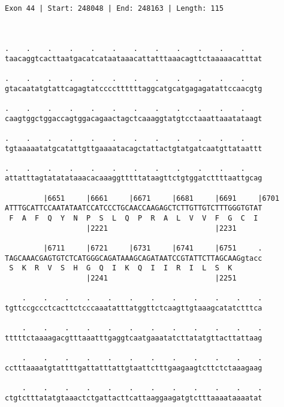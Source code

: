 \documentclass{article}
\begin{document}
\begin{Verbatim}
  
 
Exon 44 | Start: 248048 | End: 248163 | Length: 115



.    .    .    .    .    .    .    .    .    .    .    .    
taacaggtcacttaatgacatcataataaacattatttaaacagttctaaaaacatttat
                                                            
.    .    .    .    .    .    .    .    .    .    .    .    
gtacaatatgtattcagagtatccccttttttaggcatgcatgagagatattccaacgtg
                                                            
.    .    .    .    .    .    .    .    .    .    .    .    
caagtggctggaccagtggacagaactagctcaaaggtatgtcctaaattaaatataagt
                                                            
.    .    .    .    .    .    .    .    .    .    .    .    
tgtaaaaatatgcatattgttgaaaatacagctattactgtatgatcaatgttataattt
                                                            
.    .    .    .    .    .    .    .    .    .    .    .    
attatttagtatatataaacacaaaggtttttataagttctgtggatcttttaattgcag
                                                            
         |6651     |6661     |6671     |6681     |6691     |6701
ATTTGCATTCCAATATAATCCATCCCTGCAACCAAGAGCTCTTGTTGTCTTTGGGTGTAT
 F  A  F  Q  Y  N  P  S  L  Q  P  R  A  L  V  V  F  G  C  I 
                   |2221                         |2231      
  
         |6711     |6721     |6731     |6741     |6751     .
TAGCAAACGAGTGTCTCATGGGCAGATAAAGCAGATAATCCGTATTCTTAGCAAGgtacc
 S  K  R  V  S  H  G  Q  I  K  Q  I  I  R  I  L  S  K       
                   |2241                         |2251      
  
    .    .    .    .    .    .    .    .    .    .    .    .
tgttccgccctcacttctcccaaatatttatggttctcaagttgtaaagcatatctttca
                                                            
    .    .    .    .    .    .    .    .    .    .    .    .
tttttctaaaagacgtttaaatttgaggtcaatgaaatatcttatatgttacttattaag
                                                            
    .    .    .    .    .    .    .    .    .    .    .    .
cctttaaaatgtattttgattatttattgtaattctttgaagaagtcttctctaaagaag
                                                            
    .    .    .    .    .    .    .    .    .    .    .    .
ctgtctttatatgtaaactctgattacttcattaaggaagatgtctttaaaataaaatat
                                                            

\end{Verbatim}
\end{document}
